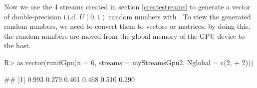 \documentclass[article,nojss]{jss}\usepackage[]{graphicx}\usepackage[]{color}
\renewcommand{\subfloat}[2][need a sub-caption]{ \subcaptionbox{#1}{#2} }
\newcommand{\fct}[1]{\code{#1()}}
\begin{document}

Now we use the 4 streams created in section \ref{createstreams} to generate a vector of double-precision i.i.d. $U(0,1)$ random numbers with \fct{runifGpu}. To view the generated random numbers, we need to convert them to  vectors or matrices, by doing this, the random numbers are moved from the global memory of the GPU device to the host.
\begin{CodeChunk}
\begin{CodeInput}
R> as.vector(runifGpu(n = 6, streams = myStreamsGpu2, Nglobal = c(2,
+    2)))
\end{CodeInput}
\begin{CodeOutput}
## [1] 0.993 0.279 0.401 0.468 0.510 0.290
\end{CodeOutput} 
\end{CodeChunk} 
\end{document}
